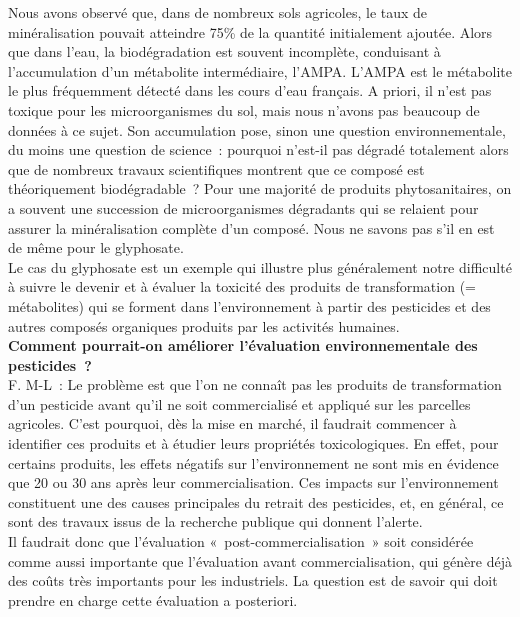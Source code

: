\documentclass[8pt]{article}
\begin{document}
Nous avons observé que, dans de nombreux sols agricoles, le taux de minéralisation pouvait atteindre 75\% de la quantité initialement ajoutée. Alors que dans l’eau, la biodégradation est souvent incomplète, conduisant à l’accumulation d’un métabolite intermédiaire, l’AMPA. L’AMPA est le métabolite le plus fréquemment détecté dans les cours d’eau français. A priori, il n’est pas toxique pour les microorganismes du sol, mais nous n’avons pas beaucoup de données à ce sujet. Son accumulation pose, sinon une question environnementale, du moins une question de science~: pourquoi n’est-il pas dégradé totalement alors que de nombreux travaux scientifiques montrent que ce composé est théoriquement biodégradable~? Pour une majorité de produits phytosanitaires, on a souvent une succession de microorganismes dégradants qui se relaient pour assurer la minéralisation complète d’un composé. Nous ne savons pas s’il en est de même pour le glyphosate.\\
\newpage
Le cas du glyphosate est un exemple qui illustre plus généralement notre difficulté à suivre le devenir et à évaluer la toxicité des produits de transformation (= métabolites) qui se forment dans l’environnement à partir des pesticides et des autres composés organiques produits par les activités humaines.\\

\textbf{Comment pourrait-on améliorer l'évaluation environnementale des pesticides~?}\\

F. M-L~: Le problème est que l’on ne connaît pas les produits de transformation d’un pesticide avant qu’il ne soit commercialisé et appliqué sur les parcelles agricoles. C’est pourquoi, dès la mise en marché, il faudrait commencer à identifier ces produits et à étudier leurs propriétés toxicologiques. En effet, pour certains produits, les effets négatifs sur l’environnement ne sont mis en évidence que 20 ou 30 ans après leur commercialisation. Ces impacts sur l’environnement constituent une des causes principales du retrait des pesticides, et, en général, ce sont des travaux issus de la recherche publique qui donnent l’alerte.\\

Il faudrait donc que l’évaluation «~post-commercialisation~» soit considérée comme aussi importante que l’évaluation avant commercialisation, qui génère déjà des coûts très importants pour les industriels. La question est de savoir qui doit prendre en charge cette évaluation a posteriori.\\
\end{document}
